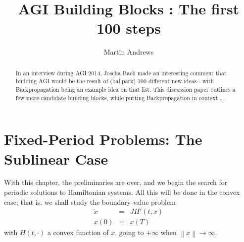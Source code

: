 \documentclass{llncs}
\begin{document}
%
\frontmatter          %
%
\pagestyle{headings}  %
%
\mainmatter              %
%
\title{AGI Building Blocks : The first 100 steps}
%
%
\author{Martin Andrews}
%
%
%

\maketitle              %

\begin{abstract}
In an interview during AGI 2014, Joscha Bach made an interesting comment that 
building AGI would be the result of (ballpark) 100 different new ideas - 
with Backpropagation being an example idea on that list.  This discussion paper 
outlines a few more candidate building blocks, while putting Backpropagation 
in context
\dots
{}
\end{abstract}
%
\section{Fixed-Period Problems: The Sublinear Case}
%




With this chapter, the preliminaries are over, and we begin the search
for periodic solutions to Hamiltonian systems. All this will be done in
the convex case; that is, we shall study the boundary-value problem
\begin{eqnarray*}
  \dot{x}&=&JH' (t,x)\\
  x(0) &=& x(T)
\end{eqnarray*}
with $H(t,\cdot)$ a convex function of $x$, going to $+\infty$ when
$\left\|x\right\| \to \infty$.
\end{document}
